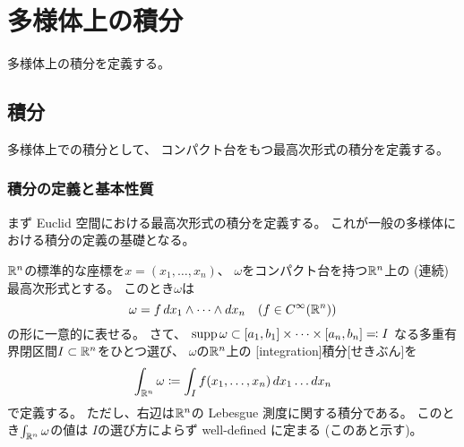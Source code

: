\documentclass[report]{jlreq}
\begin{document}
\begin{answer}
    \TODO{}
\end{answer}



%
\chapter{多様体上の積分}

多様体上の積分を定義する。

%
\section{積分}

多様体上での積分として、
コンパクト台をもつ最高次形式の積分を定義する。

\subsection{積分の定義と基本性質}

まず Euclid 空間における最高次形式の積分を定義する。
これが一般の多様体における積分の定義の基礎となる。

\begin{definition}
    $\mathbb{R}^n$の標準的な座標を$x = (x_1, \dots, x_n)$、
    $\omega$をコンパクト台を持つ$\mathbb{R}^n$上の (連続) 最高次形式とする。
    このとき$\omega$は
    \begin{equation}
        \omega = f \, dx_1 \wedge \dots \wedge dx_n
            \quad
            (f \in C^\infty(\mathbb{R}^n))
    \end{equation}
    の形に一意的に表せる。
    さて、
    $\operatorname{supp} \omega
        \subset [a_1, b_1] \times \dots \times [a_n, b_n]
        \eqqcolon I$
    なる多重有界閉区間$I \subset \mathbb{R}^n$をひとつ選び、
    $\omega$の$\mathbb{R}^n$上の
    [integration]{積分}[せきぶん]を
    \begin{equation}
        \int_{\mathbb{R}^n} \omega
            \coloneqq
            \int_I f(x_1, \dots, x_n) \, dx_1 \dots dx_n
    \end{equation}
    で定義する。
    ただし、右辺は$\mathbb{R}^n$の Lebesgue 測度に関する積分である。
    このとき$\int_{\mathbb{R}^n} \omega$の値は
    $I$の選び方によらず well-defined に定まる (このあと示す)。
\end{definition}
\end{document}

